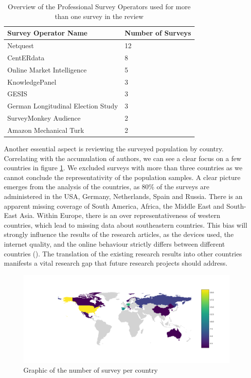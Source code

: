 \begin{table}
	\centering
	\begin{tabular}{ll}
		\toprule
		Survey Operator Name & Number of Surveys \\
		\midrule
        Netquest & 12\\
        CentERdata &8\\
        Online Market Intelligence &5\\
        KnowledgePanel  &3\\
        GESIS &3\\
        German Longitudinal Election Study &3\\
        SurveyMonkey Audience  &2\\
        Amazon Mechanical Turk & 2\\
		\bottomrule 
	\end{tabular}
	\caption{Overview of the Professional Survey Operators used for more than one survey in the review}
	\label{tab: operator}
\end{table}


Another essential aspect is reviewing the surveyed population by country. Correlating with the accumulation of authors, we can see a clear focus on a few countries in figure \ref{fig: surveys_per_country}. We excluded surveys with more than three countries as we cannot conclude the representativity of the population samples. A clear picture emerges from the analysis of the countries, as 80\% of the surveys are administered in the USA, Germany, Netherlands, Spain and Russia. There is an apparent missing coverage of South America, Africa, the Middle East and South-East Asia. Within Europe, there is an over representativeness of western countries, which lead to missing data about southeastern countries. This bias will strongly influence the results of the research articles, as the devices used, the internet quality, and the online behaviour strictly differs between different countries (\cite{rodriguez-castelan_mobile_2021, kuss_internet_2021}). The translation of the existing research results into other countries manifests a vital research gap that future research projects should address.

\begin{figure}
    \centering
    \includegraphics[width=\textwidth]{reports/figures/surveys_per_country.png}
     \caption{Graphic of the number of survey per country}
    \label{fig: surveys_per_country}
\end{figure}

